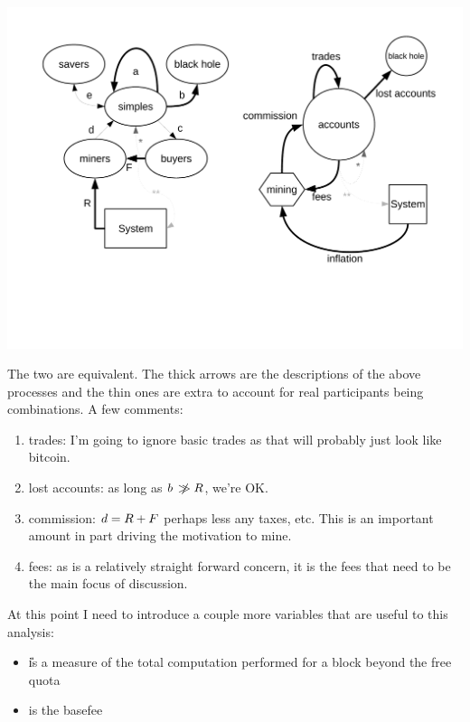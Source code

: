 \documentclass[10pt,a4paper]{article}
\begin{document}
\begin{center}
\includegraphics[trim=1cm 4cm 1cm 1.5cm, clip, width=15cm]{EtherFlow.pdf}
\end{center}

The two are equivalent. The thick arrows are the descriptions of the above processes and the thin ones are extra to account for real participants being combinations. A few comments:
\begin{enumerate}[\hspace{1cm}] \itemsep=0pt
\item trades: I'm going to ignore basic trades as that will probably just look like bitcoin. 
\item lost accounts: as long as $b\ \not\!\gg {\ensuremath{R}}$, we're OK.
\item commission: $d = {R} + F$ perhaps less any taxes, etc. This is an important amount in part driving the motivation to mine.
\item fees: as \R is a relatively straight forward concern, it is the fees that need to be the main focus of discussion.
\end{enumerate}

At this point I need to introduce a couple more variables that are useful to this analysis:
\begin{itemize} \itemsep=0pt
\item \U is a measure of the total computation performed for a block beyond the free quota
\item \x is the basefee
\end{itemize}
\end{document}
